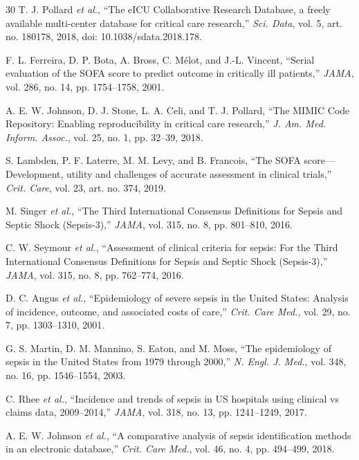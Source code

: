 \documentclass[journal]{IEEEtran}
\begin{document}
\begin{thebibliography}{30}
T. J. Pollard \emph{et al.}, ``The eICU Collaborative Research Database, a
freely available multi-center database for critical care research,''
\emph{Sci. Data}, vol. 5, art. no. 180178, 2018,
doi: 10.1038/sdata.2018.178.

F. L. Ferreira, D. P. Bota, A. Bross, C. M\'elot, and J.-L. Vincent,
``Serial evaluation of the SOFA score to predict outcome in critically ill
patients,'' \emph{JAMA}, vol. 286, no. 14, pp. 1754--1758, 2001.

A. E. W. Johnson, D. J. Stone, L. A. Celi, and T. J. Pollard, ``The MIMIC
Code Repository: Enabling reproducibility in critical care research,''
\emph{J. Am. Med. Inform. Assoc.}, vol. 25, no. 1, pp. 32--39, 2018.

S. Lambden, P. F. Laterre, M. M. Levy, and B. Francois, ``The SOFA
score---Development, utility and challenges of accurate assessment in
clinical trials,'' \emph{Crit. Care}, vol. 23, art. no. 374, 2019.

M. Singer \emph{et al.}, ``The Third International Consensus Definitions for
Sepsis and Septic Shock (Sepsis-3),'' \emph{JAMA}, vol. 315, no. 8,
pp. 801--810, 2016.

C. W. Seymour \emph{et al.}, ``Assessment of clinical criteria for sepsis:
For the Third International Consensus Definitions for Sepsis and Septic Shock
(Sepsis-3),'' \emph{JAMA}, vol. 315, no. 8, pp. 762--774, 2016.

D. C. Angus \emph{et al.}, ``Epidemiology of severe sepsis in the United
States: Analysis of incidence, outcome, and associated costs of care,''
\emph{Crit. Care Med.}, vol. 29, no. 7, pp. 1303--1310, 2001.

G. S. Martin, D. M. Mannino, S. Eaton, and M. Moss, ``The epidemiology of
sepsis in the United States from 1979 through 2000,'' \emph{N. Engl. J.
Med.}, vol. 348, no. 16, pp. 1546--1554, 2003.

C. Rhee \emph{et al.}, ``Incidence and trends of sepsis in US hospitals using
clinical vs claims data, 2009--2014,'' \emph{JAMA}, vol. 318, no. 13,
pp. 1241--1249, 2017.

A. E. W. Johnson \emph{et al.}, ``A comparative analysis of sepsis
identification methods in an electronic database,'' \emph{Crit. Care Med.},
vol. 46, no. 4, pp. 494--499, 2018.


\end{thebibliography}
\end{document}
